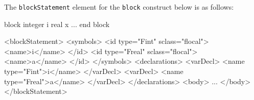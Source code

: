 The {\tt blockStatement} element for the {\tt block} construct below is as follows:
\vspace{2mm}

\begin{Fexample2008}
block
 integer i
 real x
  ...
end block
\end{Fexample2008}
\vspace{1mm}

\begin{XcodeMLFExample}
<blockStatement>
  <symbols>
     <id type="Fint" sclass="flocal">
       <name>i</name>
     </id>
     <id type="Freal" sclass="flocal">
       <name>a</name>
     </id>
   </symbols>
   <declarations>
     <varDecl>
       <name type="Fint">i</name>
     </varDecl>
     <varDecl>
       <name type="Freal">a</name>
     </varDecl>
  </declarations>
  <body>
     ...
  </body>
</blockStatement>
\end{XcodeMLFExample}


